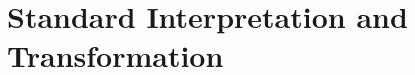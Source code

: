 \documentclass[acmsmall,10pt,review,anonymous]{acmart}\settopmatter{printfolios=true,printccs=false,printacmref=false}
\begin{document}
\section{Standard Interpretation and Transformation}
\end{document}
